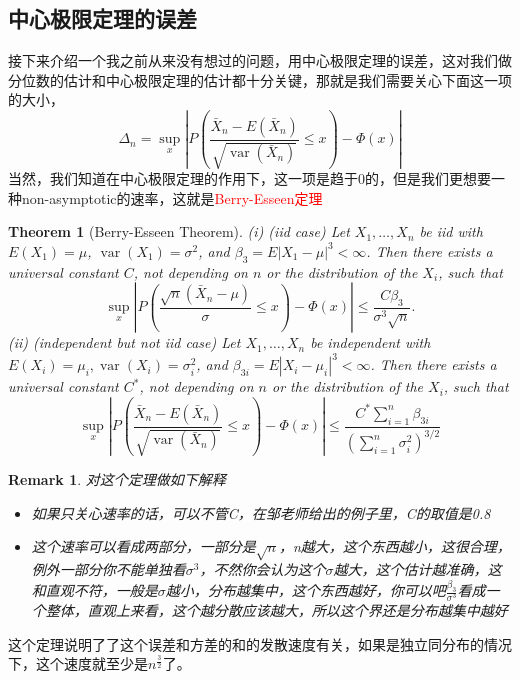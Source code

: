 \documentclass{article}
\newtheorem{theorem}{Theorem}[section]
\newtheorem{remark}{Remark}[theorem]
\begin{document}
\subsection{中心极限定理的误差}
接下来介绍一个我之前从来没有想过的问题，用中心极限定理的误差，这对我们做分位数的估计和中心极限定理的估计都十分关键，那就是我们需要关心下面这一项的大小，
\begin{equation*}
	\Delta_n=\sup_x\left|P\left(\frac{\bar{X}_n-E\left(\bar{X}_n\right)}{\sqrt{\operatorname{var}\left(\bar{X}_n\right)}} \leq x\right)-\Phi(x)\right|
\end{equation*}
当然，我们知道在中心极限定理的作用下，这一项是趋于0的，但是我们更想要一种non-asymptotic的速率，这就是\textcolor{red}{Berry-Esseen定理}
\begin{theorem}[Berry-Esseen Theorem]
	(i) (iid case) Let $X_1, \ldots, X_n$ be iid with $E\left(X_1\right)=\mu$, $\operatorname{var}\left(X_1\right)=\sigma^2$, and $\beta_3=E\left|X_1-\mu\right|^3<\infty$. Then there exists a universal constant $C$, not depending on $n$ or the distribution of the $X_i$, such that
	$$
	\sup _x\left|P\left(\frac{\sqrt{n}\left(\bar{X}_n-\mu\right)}{\sigma} \leq x\right)-\Phi(x)\right| \leq \frac{C \beta_3}{\sigma^3 \sqrt{n}} .
	$$
	(ii) (independent but not iid case) Let $X_1, \ldots, X_n$ be independent with $E\left(X_i\right)=\mu_i, \operatorname{var}\left(X_i\right)=\sigma_i^2$, and $\beta_{3 i}=E\left|X_i-\mu_i\right|^3<\infty$. Then there exists a universal constant $C^*$, not depending on $n$ or the distribution of the $X_i$, such that
	$$
	\sup _x\left|P\left(\frac{\bar{X}_n-E\left(\bar{X}_n\right)}{\sqrt{\operatorname{var}\left(\bar{X}_n\right)}} \leq x\right)-\Phi(x)\right| \leq \frac{C^* \sum_{i=1}^n \beta_{3 i}}{\left(\sum_{i=1}^n \sigma_i^2\right)^{3 / 2}}
	$$
\end{theorem}
\begin{remark}
	对这个定理做如下解释
	\begin{itemize}
		\item 如果只关心速率的话，可以不管C，在邹老师给出的例子里，C的取值是0.8
		\item 这个速率可以看成两部分，一部分是$\sqrt{n}$，n越大，这个东西越小，这很合理，例外一部分你不能单独看$\sigma^3$，不然你会认为这个$\sigma$越大，这个估计越准确，这和直观不符，一般是$\sigma$越小，分布越集中，这个东西越好，你可以吧$\frac{\beta_3}{\sigma^3}$看成一个整体，直观上来看，这个越分散应该越大，所以这个界还是分布越集中越好
	\end{itemize}
\end{remark}
这个定理说明了了这个误差和方差的和的发散速度有关，如果是独立同分布的情况下，这个速度就至少是$n^{\frac{3}{2}}$了。
\end{document}
